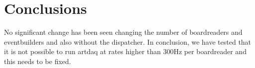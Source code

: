 \documentclass[12pt]{article}
\begin{document}
\section{Conclusions}
No significant change has been seen changing the number of boardreaders and eventbuilders and also without the dispatcher.
In conclusion, we have tested that it is not possible to run artdaq at rates higher than 300Hz per boardreader and this needs to be fixed. 
\end{document}
